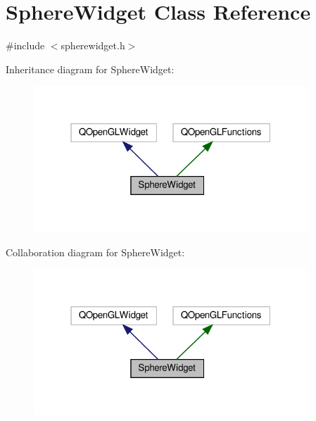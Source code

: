 \hypertarget{class_sphere_widget}{}\section{Sphere\+Widget Class Reference}
\label{class_sphere_widget}


{\ttfamily \#include $<$spherewidget.\+h$>$}



Inheritance diagram for Sphere\+Widget\+:
\nopagebreak
\begin{figure}[H]
\begin{center}
\leavevmode
\includegraphics[width=292pt]{class_sphere_widget__inherit__graph}
\end{center}
\end{figure}


Collaboration diagram for Sphere\+Widget\+:
\nopagebreak
\begin{figure}[H]
\begin{center}
\leavevmode
\includegraphics[width=292pt]{class_sphere_widget__coll__graph}
\end{center}
\end{figure}
